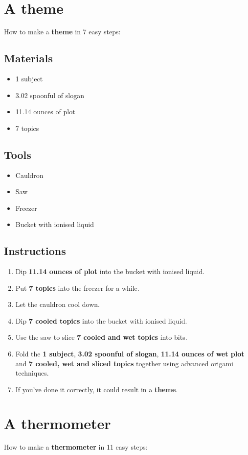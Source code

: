 \documentclass{article}
\begin{document}
\section{A theme}How to make a \textbf{theme} in 7 easy steps:

\subsection{Materials}\begin{itemize}
\item 
1 subject
\item 
3.02 spoonful of slogan
\item 
11.14 ounces of plot
\item 
7 topics
\end{itemize}
\subsection{Tools}\begin{itemize}
\item 
Cauldron
\item 
Saw
\item 
Freezer
\item 
Bucket with ionised liquid
\end{itemize}
\subsection{Instructions}\begin{enumerate}
\item 
Dip \textbf{11.14 ounces of plot} into the bucket with ionised liquid.
\item 
Put \textbf{7 topics} into the freezer for a while.
\item 
Let the cauldron cool down.
\item 
Dip \textbf{7 cooled topics} into the bucket with ionised liquid.
\item 
Use the saw to slice \textbf{7 cooled and wet topics} into bits.
\item 
Fold the \textbf{1 subject}, \textbf{3.02 spoonful of slogan}, \textbf{11.14 ounces of wet plot} and \textbf{7 cooled, wet and sliced topics} together using advanced origami techniques.
\item 
If you've done it correctly, it could result in a \textbf{theme}.
\end{enumerate}
\newpage
\section{A thermometer}How to make a \textbf{thermometer} in 11 easy steps:
\end{document}
